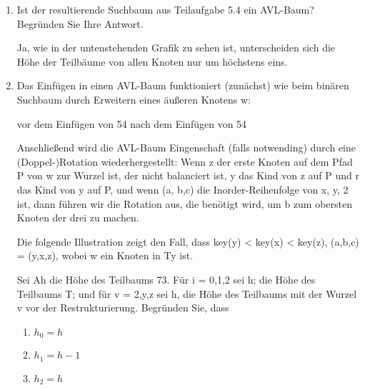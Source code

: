 \documentclass{lehramt-informatik-aufgabe}
\begin{document}
\begin{enumerate}
\begin{liAntwort}
\end{liAntwort}

\item Ist der resultierende Suchbaum aus Teilaufgabe 5.4 ein AVL-Baum?
Begründen Sie Ihre Antwort.

\begin{liAntwort}
Ja, wie in der untenstehenden Grafik zu sehen ist, unterscheiden sich
die Höhe der Teilbäume von allen Knoten nur um höchstens eins.


\end{liAntwort}

\item Das Einfügen in einen AVL-Baum funktioniert (zunächst) wie beim binären
Suchbaum durch Erweitern eines äußeren Knotens w:

vor dem Einfügen von 54 nach dem Einfügen von 54

Anschließend wird die AVL-Baum Eingenschaft (falls notwending) durch eine
(Doppel-)Rotation wiederhergestellt: Wenn z der erste Knoten auf dem Pfad P von w zur
Wurzel ist, der nicht balanciert ist, y das Kind von z auf P und r das Kind von y auf P,
und wenn (a, b,c) die Inorder-Reihenfolge von x, y, 2 ist, dann führen wir die Rotation aus,
die benötigt wird, um b zum obersten Knoten der drei zu machen.

Die folgende Illustration zeigt den Fall, dass key(y) < key(x) < key(z), \dh
(a,b,c) = (y,x,z), wobei w ein Knoten in Ty ist.

Sei Ah die Höhe des Teilbaums 73. Für i = 0,1,2 sei h; die Höhe des Teilbaums T; und
für v = 2,y,z sei h, die Höhe des Teilbaums mit der Wurzel v vor der Restrukturierung.
Begründen Sie, dass

\begin{enumerate}

\item $h_0 = h$

\item $h_1 = h - 1$

\item  $h_2 = h$


\end{enumerate}
\end{enumerate}
\end{document}
